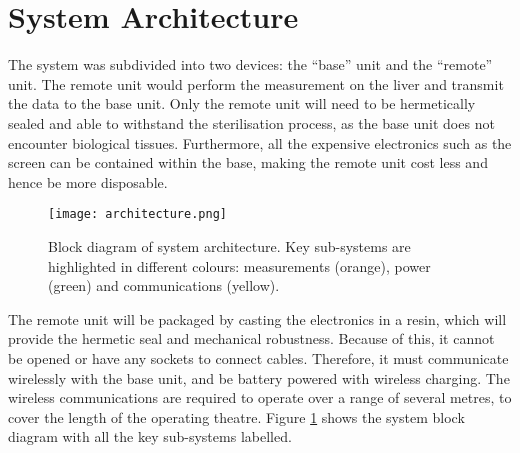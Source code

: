 \section{System Architecture}

The system was subdivided into two devices: the ``base'' unit and the ``remote'' unit. The remote unit would perform the measurement on the liver and transmit the data to the base unit. Only the remote unit will need to be hermetically sealed and able to withstand the sterilisation process, as the base unit does not encounter biological tissues. Furthermore, all the expensive electronics such as the screen can be contained within the base, making the remote unit cost less and hence be more disposable.\\

\begin{figure}[htb]
	\centering
	\texttt{[image: architecture.png]}
	\caption{Block diagram of system architecture. Key sub-systems are highlighted in different colours: measurements (orange), power (green) and communications (yellow).}
	\label{fig: architecture}
\end{figure}

The remote unit will be packaged by casting the electronics in a resin, which will provide the hermetic seal and mechanical robustness. Because of this, it cannot be opened or have any sockets to connect cables. Therefore, it must communicate wirelessly with the base unit, and be battery powered with wireless charging. The wireless communications are required to operate over a range of several metres, to cover the length of the operating theatre. Figure \ref{fig: architecture} shows the system block diagram with all the key sub-systems labelled.
